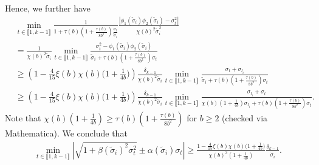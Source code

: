 \documentclass[reqno]{amsart}
\theoremstyle{plain}
\theoremstyle{definition}
\begin{document}
Hence, we further have 
\begingroup
\allowdisplaybreaks
\begin{align*}
&\min_{t\in \llbracket 1, k-1\rrbracket}\frac{1}{1+\tau(b)\left(1 +\frac{\tau(b)}{8b^2} \right)\frac{\sigma_t}{\widetilde \sigma_i}
} \frac{|\phi_1(\widetilde\sigma_i)\phi_2(\widetilde\sigma_i)-\sigma_t^2|}{ \chi(b)^2\widetilde\sigma_i^2}\\
&=\frac{1}{ \chi(b)^2 \widetilde\sigma_i} \min_{t\in \llbracket 1, k-1\rrbracket} \frac{\sigma_t^2-\phi_1(\widetilde\sigma_i)\phi_2(\widetilde\sigma_i)}{\widetilde\sigma_i+\tau(b)\left(1 +\frac{\tau(b)}{8b^2} \right){\sigma_t}}\\
&\ge  \left( 1- \frac{4}{15}\xi(b)\chi(b)\big(1+\frac{1}{4b}\big) \right)\frac{\delta_{k-1}}{ \chi(b)^2 \widetilde\sigma_i}  \min_{t\in \llbracket 1, k-1\rrbracket} \frac{\sigma_t +\sigma_{l_i}}{\widetilde\sigma_i+\tau(b)\left(1 +\frac{\tau(b)}{8b^2} \right){\sigma_t}}\\
&\ge \left( 1- \frac{4}{15}\xi(b)\chi(b)\big(1+\frac{1}{4b}\big) \right)\frac{\delta_{k-1}}{ \chi(b)^2 \widetilde\sigma_i}  \min_{t\in \llbracket 1, k-1\rrbracket} \frac{\sigma_{l_i}+\sigma_t}{ \chi(b)\left( 1+\frac{1}{4b} \right)\sigma_{l_i}+\tau(b)\left(1 +\frac{\tau(b)}{8b^2} \right){\sigma_t}}.
\end{align*}
\endgroup
Note that $\chi(b)\left( 1+\frac{1}{4b} \right) \ge \tau(b)\left(1 +\frac{\tau(b)}{8b^2} \right)$ for $b\ge 2$ (checked via Mathematica). We conclude that
\begin{align}\label{eq:firstcase}
\min_{t\in \llbracket 1, k-1\rrbracket} \left| \sqrt{1+\beta(\widetilde \sigma_i)^2 \sigma_t^2} \pm \alpha(\widetilde \sigma_i) \sigma_t \right|\ge \frac{1- \frac{4}{15}\xi(b)\chi(b)\big(1+\frac{1}{4b}\big)}{ \chi(b)^3 \left( 1+\frac{1}{4b} \right)} \frac{\delta_{k-1}}{\widetilde\sigma_i}.
\end{align}
\end{document}
